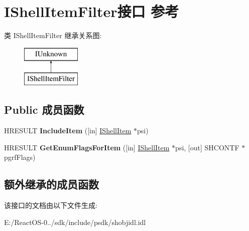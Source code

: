 \hypertarget{interface_i_shell_item_filter}{}\section{I\+Shell\+Item\+Filter接口 参考}
\label{interface_i_shell_item_filter}
类 I\+Shell\+Item\+Filter 继承关系图\+:\begin{figure}[H]
\begin{center}
\leavevmode
\includegraphics[height=2.000000cm]{interface_i_shell_item_filter}
\end{center}
\end{figure}
\subsection*{Public 成员函数}
\begin{DoxyCompactItemize}
\item 
\mbox{\label{interface_i_shell_item_filter_a1b4cf599b1a937da46754a7911b566e6}} 
H\+R\+E\+S\+U\+LT {\bfseries Include\+Item} (\mbox{[}in\mbox{]} \hyperlink{interface_i_shell_item}{I\+Shell\+Item} $\ast$psi)
\item 
\mbox{\label{interface_i_shell_item_filter_a700bc1e87548ae5dc17b59190cea5a38}} 
H\+R\+E\+S\+U\+LT {\bfseries Get\+Enum\+Flags\+For\+Item} (\mbox{[}in\mbox{]} \hyperlink{interface_i_shell_item}{I\+Shell\+Item} $\ast$psi, \mbox{[}out\mbox{]} S\+H\+C\+O\+N\+TF $\ast$pgrf\+Flags)
\end{DoxyCompactItemize}
\subsection*{额外继承的成员函数}


该接口的文档由以下文件生成\+:\begin{DoxyCompactItemize}
\item 
E\+:/\+React\+O\+S-\/0../sdk/include/psdk/shobjidl.\+idl\end{DoxyCompactItemize}
